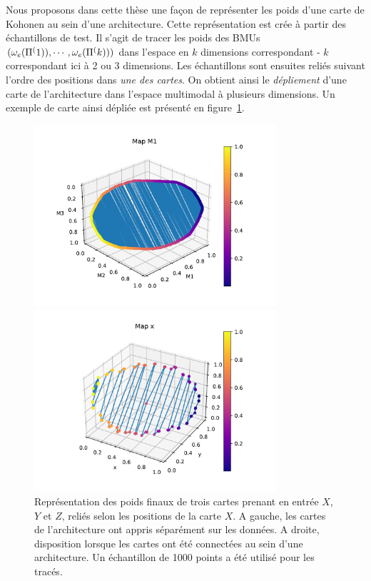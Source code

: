 Nous proposons dans cette thèse une façon de représenter les poids d'une carte de Kohonen au sein d'une architecture. Cette représentation est crée à partir des échantillons de test. Il s'agit de tracer les poids des BMUs $(\omega_e(\Pi^({1})),\cdots,\omega_e(\Pi^({k})))$ dans l'espace en $k$ dimensions correspondant - $k$ correspondant ici à 2 ou 3 dimensions. Les échantillons sont ensuites reliés suivant l'ordre des positions dans \emph{une des cartes}. On obtient ainsi le \emph{dépliement} d'une carte de l'architecture dans l'espace multimodal à plusieurs dimensions. Un exemple de carte ainsi dépliée est présenté en figure~\ref{fig:distortion}.
\begin{figure}
\begin{minipage}{0.5\textwidth}
\centering\includegraphics[width=0.8\textwidth]{unco3som}
\end{minipage}
\begin{minipage}{0.5\textwidth}
\centering\includegraphics[width=0.8\textwidth]{disto_Mx}
\end{minipage}
\caption{Représentation des poids finaux de trois cartes prenant en entrée $X$,$Y$ et $Z$, reliés selon les positions de la carte $X$. A gauche, les cartes de l'architecture ont appris séparément sur les données. A droite, disposition lorsque les cartes ont été connectées au sein d'une architecture. Un échantillon de 1000 points a été utilisé pour les tracés.}
\label{fig:distortion}
\end{figure}

